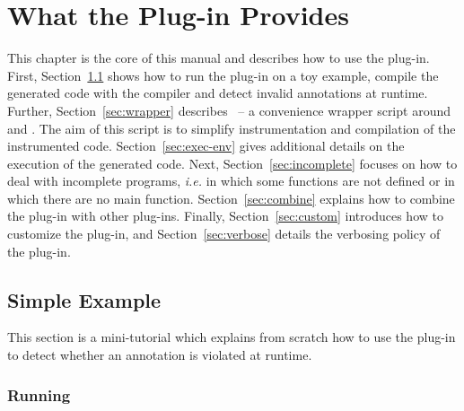 \chapter{What the Plug-in Provides}

This chapter is the core of this manual and describes how to use the \eacsl
plug-in.
First, Section~\ref{sec:simple} shows how to run the plug-in on a toy example,
compile the generated code with the \gcc compiler and detect invalid
annotations at runtime.  Further, Section~\ref{sec:wrapper} describes \eacslgcc\
-- a convenience wrapper script around \framac and \gcc. The aim of this script
is to simplify instrumentation and compilation of the instrumented code.
Section~\ref{sec:exec-env} gives additional details on the execution of the
generated code. Next, Section~\ref{sec:incomplete} focuses on how to deal with
incomplete programs, \emph{i.e.} in which some functions are not defined or in
which there are no main function. Section~\ref{sec:combine} explains how to
combine the \eacsl plug-in with other \framac plug-ins. Finally,
Section~\ref{sec:custom} introduces how to customize the plug-in, and
Section~\ref{sec:verbose} details the verbosing policy of the plug-in.

\section{Simple Example} %
\label{sec:simple}

This section is a mini-tutorial which explains from scratch how to use the
\eacsl plug-in to detect whether an \eacsl annotation is violated at runtime.



\subsection{Running \eacsl}
\label{sec:run}

